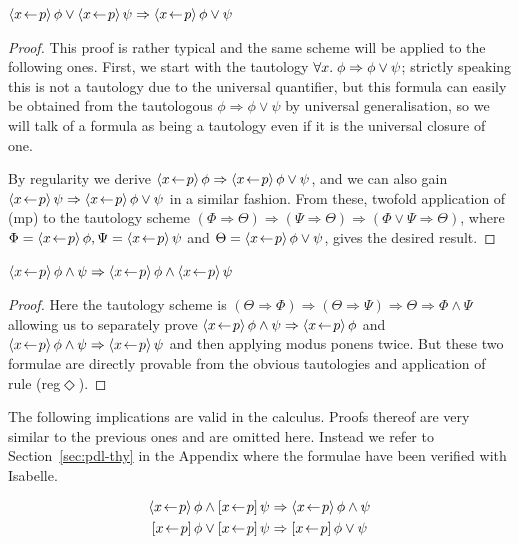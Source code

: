 \begin{lem}
  $\langle x\!\gets\! p\rangle\,{\phi} \lor \langle x\!\gets\! p\rangle\,{\psi} \Rightarrow \langle x\!\gets\! p\rangle\,{\phi \lor \psi}$
\end{lem}
\begin{proof}
  This proof is rather typical and the same scheme will be applied to the
  following ones. First, we start with the tautology $\forall x.\; \phi \Rightarrow \phi \lor \psi$;
  strictly speaking this is not a tautology due to the universal quantifier, but
  this formula can easily be obtained from the tautologous $\phi \Rightarrow \phi \lor \psi$ by
  universal generalisation, so we will talk of a formula as being a tautology
  even if it is the universal closure of one.

  By regularity we derive $\langle x\!\gets\! p\rangle\,{\phi} \Rightarrow \langle x\!\gets\! p\rangle\,{\phi \lor \psi}$, and we can also gain
  $\langle x\!\gets\! p\rangle\,{\psi} \Rightarrow \langle x\!\gets\! p\rangle\,{\phi \lor \psi}$ in a similar fashion. From these, twofold
  application of (mp) to the tautology scheme $(\Phi \Rightarrow \Theta) \Rightarrow (\Psi \Rightarrow \Theta) \Rightarrow (\Phi \lor \Psi \Rightarrow \Theta)$,
  where $\Phi = \langle x\!\gets\! p\rangle\,{\phi}, \Psi = \langle x\!\gets\! p\rangle\,{\psi}$ and $\Theta = \langle x\!\gets\! p\rangle\,{\phi \lor \psi}$, gives the
  desired result.
\end{proof}

\begin{lem}
  $\langle x\!\gets\! p\rangle\,{\phi \land \psi} \Rightarrow \langle x\!\gets\! p\rangle\,{\phi} \land \langle x\!\gets\! p\rangle\,{\psi}$
\end{lem}
\begin{proof}
  Here the tautology scheme is $(\Theta \Rightarrow \Phi) \Rightarrow (\Theta \Rightarrow \Psi) \Rightarrow \Theta  \Rightarrow \Phi  \land \Psi $ allowing us to
  separately prove $\langle x\!\gets\! p\rangle\,{\phi\land\psi} \Rightarrow \langle x\!\gets\! p\rangle\,{\phi}$ and $\langle x\!\gets\! p\rangle\,{\phi\land\psi} \Rightarrow \langle x\!\gets\! p\rangle\,{\psi}$ and
  then applying modus ponens twice. But these two formulae are directly provable
  from the obvious tautologies and application of rule (reg$\Diamond$).
\end{proof}

\begin{lem}
  \label{thm:more-distrib}
  The following implications are valid in the calculus. Proofs thereof are very
  similar to the previous ones and are omitted here. Instead we refer to
  Section~\ref{sec:pdl-thy} in the Appendix where the formulae have been
  verified with Isabelle.

  \begin{gather*}
      \xpdmd{\phi} \land \xpbox{\psi} \Rightarrow \xpdmd{\phi \land \psi} \\
      \xpbox{\phi} \lor \xpbox{\psi} \Rightarrow \xpbox{\phi \lor \psi}
  \end{gather*}
\end{lem}

